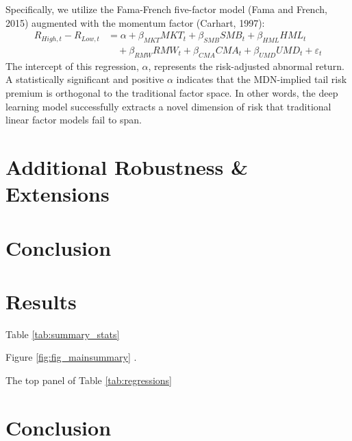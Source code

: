 \documentclass[12pt]{article}
\begin{document}
Specifically, we utilize the Fama-French five-factor model (Fama and French, 2015) augmented with the momentum factor (Carhart, 1997):
\begin{equation}
\begin{aligned}
    R_{High,t} - R_{Low,t} &= \alpha + \beta_{MKT} MKT_t + \beta_{SMB} SMB_t + \beta_{HML} HML_t \\
    &\quad + \beta_{RMW} RMW_t + \beta_{CMA} CMA_t + \beta_{UMD} UMD_t + \varepsilon_t
\end{aligned}
\end{equation}
The intercept of this regression, $\alpha$, represents the risk-adjusted abnormal return. A statistically significant and positive $\alpha$ indicates that the MDN-implied tail risk premium is orthogonal to the traditional factor space. In other words, the deep learning model successfully extracts a novel dimension of risk that traditional linear factor models fail to span.

\section{Additional Robustness \& Extensions}

\section{Conclusion}


\section{Results \label{sec:results}}




% 


Table \ref{tab:summary_stats} 

% 

Figure \ref{fig:fig_mainsummary} .

% 

The top panel of Table \ref{tab:regressions} 

\section{Conclusion \label{sec:conclusion}}






\clearpage
\begin{singlespace}
%
%


\end{singlespace}
\end{document}
